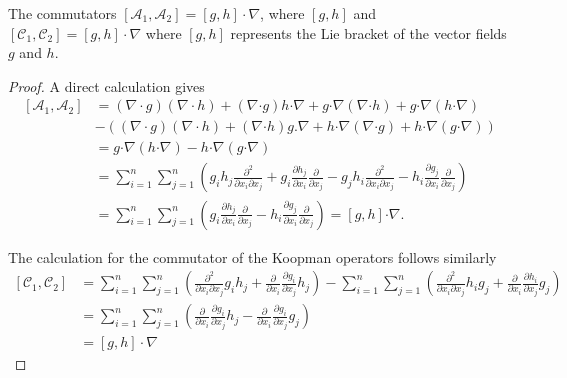 \documentclass[10pt,a4paper]{amsart}
\begin{document}
\begin{lemma}
The commutators $[\mathcal{A}_1,\mathcal{A}_2] = [g,h] \cdot \nabla$, where $[g,h]$ and $[\mathcal{C}_1,\mathcal{C}_2] = [g,h] \cdot \nabla$ where $[g,h]$ represents the Lie bracket of the vector fields $g$ and $h$.
\end{lemma}

\begin{proof} A direct calculation gives 
\begin{equation}
\begin{split}
[\mathcal{A}_1,\mathcal{A}_2] &=  (\nabla\cdot g)(\nabla \cdot h) + (\nabla \boldsymbol{\cdot} g) h \boldsymbol{\cdot} \nabla + g\boldsymbol{\cdot} \nabla(\nabla \boldsymbol{\cdot} h) + g \boldsymbol{\cdot} \nabla(h\boldsymbol{\cdot}  \nabla) \\
& -\left((\nabla\cdot g)(\nabla \cdot h) + (\nabla \boldsymbol{\cdot} h)g.\nabla + h \boldsymbol{\cdot} \nabla (\nabla \boldsymbol{\cdot} g) + h \boldsymbol{\cdot} \nabla (g \boldsymbol{\cdot} \nabla)\right) \\
& = g \boldsymbol{\cdot} \nabla(h\boldsymbol{\cdot}  \nabla) - h \boldsymbol{\cdot} \nabla (g \boldsymbol{\cdot} \nabla)\\
&=\sum_{i=1}^n\sum_{j=1}^n\left(g_ih_j \frac{\partial^2}{\partial x_i \partial x_j} +  g_i \frac{\partial h_j}{\partial x_i}\frac{\partial }{\partial x_j} - g_jh_i \frac{\partial^2}{\partial x_i \partial x_j} -  h_i \frac{\partial g_j}{\partial x_i}\frac{\partial }{\partial x_j} \right)\\
&=\sum_{i=1}^n\sum_{j=1}^n\left(g_i \frac{\partial h_j}{\partial x_i}\frac{\partial }{\partial x_j} -  h_i \frac{\partial g_j}{\partial x_i}\frac{\partial }{\partial x_j}\right) =[g,h] \boldsymbol{\cdot}   \nabla.
\end{split}
\end{equation}

The calculation for the commutator of the Koopman operators follows similarly 
\begin{equation}
\begin{split}
[\mathcal{C}_1,\mathcal{C}_2]  &=   \sum_{i=1}^n\sum_{j=1}^n \left( \frac{\partial^2 }{\partial x_i \partial x_j} g_i h_j + \frac{\partial }{\partial x_i}\frac{\partial g_i}{\partial x_j} h_j \right) - \sum_{i=1}^n\sum_{j=1}^n \left( \frac{\partial^2 }{\partial x_i \partial x_j} h_i g_j + \frac{\partial }{\partial x_i}\frac{\partial h_i}{\partial x_j} g_j \right) \\
&= \sum_{i=1}^n\sum_{j=1}^n \left( \frac{\partial }{\partial x_i}\frac{\partial g_i}{\partial x_j} h_j - \frac{\partial }{\partial x_i}\frac{\partial g_i}{\partial x_j} g_j   \right)\\
&=  [g,h] \cdot \nabla
\end{split}
\end{equation}
\end{proof}
\end{document}
